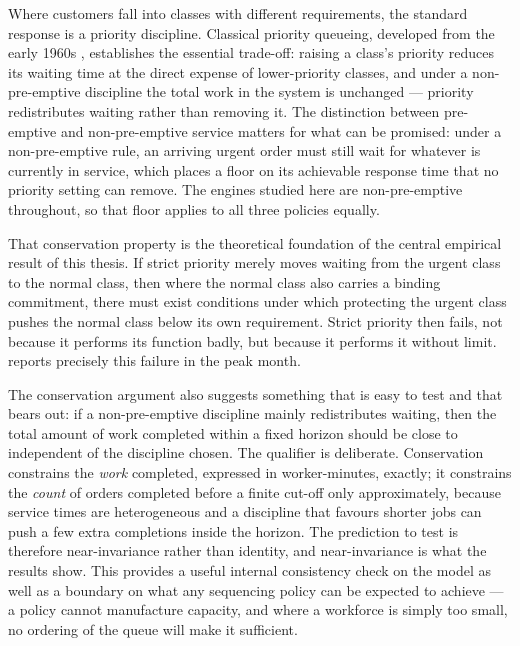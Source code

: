 Where customers fall into classes with different requirements, the standard response is a
priority discipline. Classical priority queueing, developed from the early 1960s
\citep{aviitzhak1961}, establishes the essential trade-off: raising a class's priority reduces
its waiting time at the direct expense of lower-priority classes, and under a non-pre-emptive
discipline the total work in the system is unchanged --- priority redistributes waiting rather
than removing it. The distinction between pre-emptive and non-pre-emptive service matters for
what can be promised: under a non-pre-emptive rule, an arriving urgent order must still wait for
whatever is currently in service, which places a floor on its achievable response time that no
priority setting can remove. The engines studied here are non-pre-emptive throughout, so that
floor applies to all three policies equally.

That conservation property is the theoretical foundation of the central empirical result of this
thesis. If strict priority merely moves waiting from the urgent class to the normal class, then
where the normal class also carries a binding commitment, there must exist conditions under
which protecting the urgent class pushes the normal class below its own requirement. Strict
priority then fails, not because it performs its function badly, but because it performs it
without limit.  reports precisely this failure in the peak month.

The conservation argument also suggests something that is easy to test and that
 bears out: if a non-pre-emptive discipline mainly redistributes waiting,
then the total amount of work completed within a fixed horizon should be close to independent of
the discipline chosen. The qualifier is deliberate. Conservation constrains the \emph{work}
completed, expressed in worker-minutes, exactly; it constrains the \emph{count} of orders
completed before a finite cut-off only approximately, because service times are heterogeneous
and a discipline that favours shorter jobs can push a few extra completions inside the horizon.
The prediction to test is therefore near-invariance rather than identity, and near-invariance is
what the results show. This provides a useful internal consistency check on the model as well as
a boundary on what any sequencing policy can be expected to achieve --- a policy cannot
manufacture capacity, and where a workforce is simply too small, no ordering of the queue will
make it sufficient.

